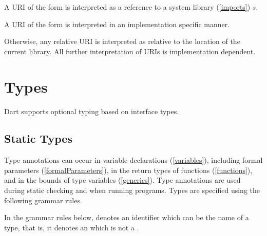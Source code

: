 \documentclass[makeidx]{article}
\begin{document}
{\LMHash{}%
A URI of the form  is interpreted as a reference to a system library (\ref{imports}) $s$.

\LMHash{}%
A URI of the form  is interpreted in an implementation specific manner.


\LMHash{}%
Otherwise, any relative URI is interpreted as relative to the location of the current library.
All further interpretation of URIs is implementation dependent.



\section{Types}

\LMHash{}%
Dart supports optional typing based on interface types.



\subsection{Static Types}

\LMHash{}%
Type annotations can occur in variable declarations (\ref{variables}),
including formal parameters (\ref{formalParameters}),
in the return types of functions (\ref{functions}),
and in the bounds of type variables (\ref{generics}).
Type annotations are used during static checking and when running programs.
Types are specified using the following grammar rules.

\LMHash{}%
In the grammar rules below,  denotes an identifier which can be
the name of a type, that is, it denotes an  which is not a
.

}
\end{document}
